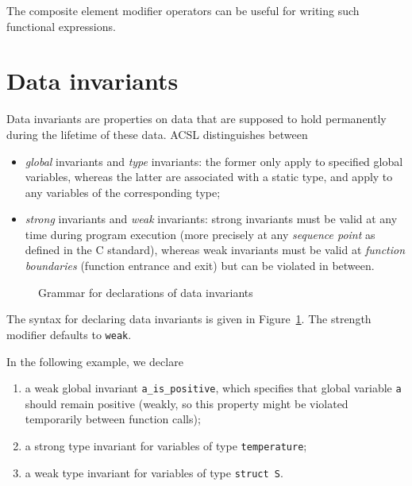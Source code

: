 \begin{example}
  The composite element modifier operators 
  can be useful for writing such functional expressions.
\end{example}

\section{Data invariants}
\label{sec:invariants}
Data invariants are properties on data that are supposed to hold
permanently during the lifetime of these data. ACSL distinguishes
between
\begin{itemize}
\item \emph{global} invariants and \emph{type} invariants: the former
  only apply to specified global variables, whereas the latter are
  associated with a static type, and apply to any variables of
  the corresponding type;
\item \emph{strong} invariants and \emph{weak} invariants:
  strong
  invariants must be valid at any time during program execution
  (more precisely at any \emph{sequence point} as defined in the C
  standard), whereas weak invariants must be valid at \emph{function
    boundaries} (function entrance and exit) but can be violated in
  between.
\end{itemize}

\begin{figure}[t]
  \begin{cadre}
      
    \end{cadre}
  \caption{Grammar for declarations of data invariants}
\label{fig:gram:datainvariants}
\end{figure}

The syntax for declaring data invariants is given in
Figure~\ref{fig:gram:datainvariants}. The strength modifier defaults
to \texttt{weak}.


\begin{example}
  In the following example, we declare
  \begin{enumerate}
  \item a weak global invariant \lstinline|a_is_positive|, which specifies that
    global variable \lstinline|a| should remain positive (weakly, so
    this property might be violated temporarily between function
    calls);
  \item a strong type invariant for variables of type \lstinline|temperature|;
  \item a weak type invariant for variables of type \lstinline|struct S|.
  \end{enumerate}
\end{example}

